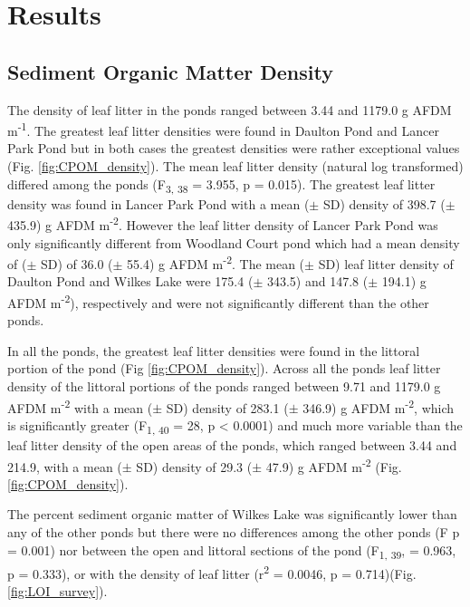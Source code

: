 \section{Results}
\subsection{Sediment Organic Matter Density}

The density of leaf litter in the ponds ranged between 3.44 and 1179.0 g AFDM m\textsuperscript{-1}. The greatest leaf litter densities were found in Daulton Pond and Lancer Park Pond but in both cases the greatest densities were rather exceptional values (Fig. \ref{fig:CPOM_density}). The mean leaf litter density (natural log transformed) differed among the ponds (F\textsubscript{3, 38} = 3.955, p = 0.015). The greatest leaf litter density was found in Lancer Park Pond with a mean ($\pm$ SD) density of 398.7 ($\pm$ 435.9) g AFDM m\textsuperscript{-2}. However the leaf litter density of Lancer Park Pond was only significantly different from Woodland Court pond which had a mean density of ($\pm$ SD) of 36.0 ($\pm$ 55.4) g AFDM m\textsuperscript{-2}. The mean ($\pm$ SD) leaf litter density of Daulton Pond and Wilkes Lake were 175.4 ($\pm$ 343.5) and 147.8 ($\pm$ 194.1) g AFDM m\textsuperscript{-2}), respectively and were not significantly different than the other ponds. 

In all the ponds, the greatest leaf litter densities were found in the littoral portion of the pond (Fig \ref{fig:CPOM_density}). Across all the ponds leaf litter density of the littoral portions of the ponds ranged between 9.71 and 1179.0 g AFDM m\textsuperscript{-2} with a mean ($\pm$ SD) density of 283.1 ($\pm$ 346.9) g AFDM m\textsuperscript{-2}, which is significantly greater (F\textsubscript{1, 40} = 28, p < 0.0001) and much more variable than the leaf litter density of the open areas of the ponds, which ranged between 3.44 and 214.9, with a mean ($\pm$ SD) density of 29.3 ($\pm$ 47.9) g AFDM m\textsuperscript{-2} (Fig. \ref{fig:CPOM_density}). 

The percent sediment organic matter of Wilkes Lake was significantly lower than any of the other ponds but there were no differences among the other ponds (F p = 0.001) nor between the open and littoral sections of the pond (F\textsubscript{1, 39}, = 0.963, p = 0.333), or with the density of leaf litter (r\textsuperscript{2} = 0.0046, p = 0.714)(Fig. \ref{fig:LOI_survey}). 

  

  
